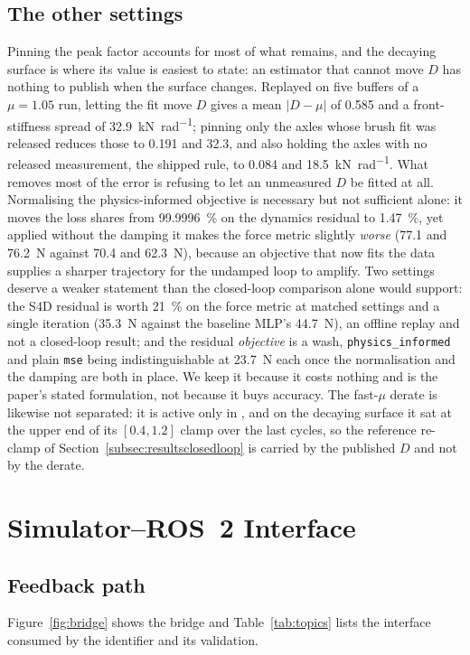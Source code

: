 \subsection*{The other settings}
Pinning the peak factor accounts for most of what remains, and the decaying
surface is where its value is easiest to state: an estimator that cannot move
$D$ has nothing to publish when the surface changes. Replayed on five buffers
of a $\mu=\num{1.05}$ run, letting the fit move $D$ gives a mean $|D-\mu|$ of
\num{0.585} and a front-stiffness spread of
\SI{32.9}{\kilo\newton\per\radian}; pinning only the axles whose brush fit was
released reduces those to \num{0.191} and \num{32.3}, and also holding the axles
with no released measurement, the shipped rule, to \num{0.084} and
\SI{18.5}{\kilo\newton\per\radian}. What removes most of the error is refusing
to let an unmeasured $D$ be fitted at all. Normalising the physics-informed
objective is necessary but not sufficient alone: it moves the loss shares from
\SI{99.9996}{\percent} on the dynamics residual to \SI{1.47}{\percent}, yet
applied without the damping it makes the force metric slightly \emph{worse}
(\num{77.1} and \SI{76.2}{\newton} against \num{70.4} and \SI{62.3}{\newton}),
because an objective that now fits the data supplies a sharper trajectory for
the undamped loop to amplify. Two settings deserve a weaker statement than the
closed-loop comparison alone would support: the S4D residual is worth
\SI{21}{\percent} on the force metric at matched settings and a single iteration
(\SI{35.3}{\newton} against the baseline MLP's \SI{44.7}{\newton}), an offline
replay and not a closed-loop result; and the residual \emph{objective} is a
wash, \texttt{physics\_informed} and plain \texttt{mse} being indistinguishable
at \SI{23.7}{\newton} each once the normalisation and the damping are both in
place. We keep it because it costs nothing and is the paper's stated
formulation, not because it buys accuracy. The fast-$\mu$ derate is likewise
not separated: it is active only in \oursarm{}, and on the decaying surface it
sat at the upper end of its $[\num{0.4},\num{1.2}]$ clamp over the last cycles,
so the reference re-clamp of Section~\ref{subsec:resultsclosedloop} is carried
by the published $D$ and not by the derate.

\section{Simulator--ROS~2 Interface}
\label{sec:iface}

\subsection*{Feedback path}
Figure~\ref{fig:bridge} shows the bridge and Table~\ref{tab:topics} lists the
interface consumed by the identifier and its validation.

